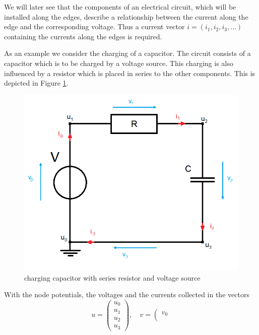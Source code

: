 We will later see that the components of an electrical circuit, which will be installed along the edges, describe a relationship between the current along the edge and the corresponding voltage. Thus a current vector $i = (i_1, i_2, i_3, ...)$ containing the currents along the edges is required.


\begin{example1}
	\label{ex:network topology}
	As an example we consider the charging of a capacitor. The circuit consists of a capacitor which is to be charged by a voltage source. This charging is also influenced by a resistor which is placed in series to the other components. This is depicted in Figure \ref{circuit:charging of capacitor}.
	\begin{figure}[H]
		\centering
		\includegraphics[scale=0.5]{pictures/Example1_simple.png}
		\caption{charging capacitor with series resistor and voltage source}
		\label{circuit:charging of capacitor}
	\end{figure}
	With the node potentials, the voltages and the currents collected in the vectors
	\begin{displaymath}
		u=
		\left(
		\begin{matrix}
			u_0 \\
			u_1 \\
			u_2 \\
			u_3 
		\end{matrix}
		\right),
		\quad
		v=
		\left(
		\begin{matrix}
			v_0 \\

\end{matrix}
\end{displaymath}
\end{example1}
